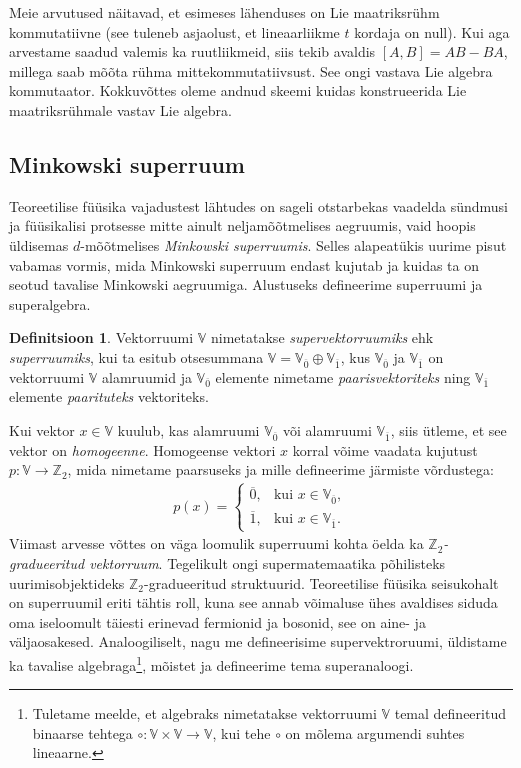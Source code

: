 \documentclass[12pt,a4paper,oneside]{article}
\theoremstyle{plain}
\theoremstyle{definition}
\newtheorem{definitsioon}{Definitsioon}[section]
\numberwithin{equation}{section}
\def\V{{\mathbb V}}
\def\Z{{\mathbb Z}}
\begin{document}
Meie arvutused näitavad, et esimeses lähenduses on Lie maatriksrühm 
kommutatiivne (see tuleneb asjaolust, et lineaarliikme $t$ kordaja 
on null). Kui aga arvestame saadud valemis ka ruutliikmeid, siis 
tekib avaldis $\left[A,B\right] = AB - BA$, millega saab mõõta rühma 
mittekommutatiivsust. See ongi vastava Lie algebra kommutaator. 
Kokkuvõttes oleme andnud skeemi kuidas konstrueerida Lie 
maatriksrühmale vastav Lie algebra.

\subsection{Minkowski superruum}

Teoreetilise füüsika vajadustest lähtudes on sageli otstarbekas 
vaadelda sünd\-musi ja füüsikalisi protsesse mitte ainult 
neljamõõtmelises aegruumis, vaid hoopis üldisemas $d$-mõõtmelises
\emph{Minkowski superruumis}. Selles alapeatükis uurime pisut 
vabamas vormis, mida Minkowski superruum endast kujutab ja kuidas 
ta on seotud tavalise Minkowski aegruumiga. Alustuseks defineerime 
superruumi ja superalgebra.

\begin{definitsioon}
Vektorruumi $\V$ nimetatakse \emph{supervektorruumiks} ehk 
\emph{superruumiks}, kui ta esitub otsesummana 
$\V = \V_{\overline{0}} \oplus \V_{\overline{1}}$, kus 
$\V_{\overline{0}}$ ja $\V_{\overline{1}}$ on vektorruumi $\V$ 
alamruumid ja $\V_{\overline{0}}$ elemente nimetame 
\emph{paarisvektoriteks} ning $\V_{\overline{1}}$ elemente 
\emph{paarituteks} vektoriteks.
\end{definitsioon}

Kui vektor $x \in \V$ kuulub, kas alamruumi $\V_{\overline{0}}$ või 
alamruumi $\V_{\overline{1}}$, siis ütleme, et see vektor on 
\emph{homogeenne}. Homogeense vektori $x$ korral võime vaadata 
kujutust $p : \V \rightarrow \Z_2$, mida nimetame paarsuseks ja mille 
defineerime järmiste võrdustega:
\begin{align*}
p\left(x\right) = \begin{cases}
    \overline{0},& \text{kui $x \in \V_{\overline{0}}$},\\
    \overline{1},& \text{kui $x \in \V_{\overline{1}}$}.
  \end{cases}
\end{align*}
Viimast arvesse võttes on väga loomulik superruumi kohta öelda ka 
\emph{$\Z_2$-graduee\-ritud vektorruum}. Tegelikult ongi 
supermatemaatika põhilisteks uurimisobjektideks $\Z_2$-gradueeritud 
struktuurid. Teoreetilise füüsika seisukohalt on superruumil 
eriti tähtis roll, kuna see annab võimaluse ühes avaldises 
siduda oma iseloomult täiesti erinevad fermionid ja bosonid, 
see on aine- ja väljaosakesed. Analoogiliselt, nagu me defineerisime 
supervektroruumi, üldistame ka tavalise algebraga\footnote{
Tuletame meelde, et algebraks nimetatakse 
vektorruumi $\V$ temal defineeritud binaarse tehtega 
$\circ : \V \times \V \rightarrow \V$, kui tehe $\circ$ on mõlema 
argumendi suhtes lineaarne.}, 
mõistet ja defineerime tema superanaloogi.
\end{document}
